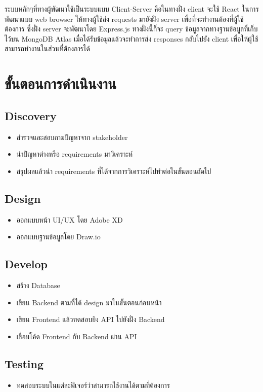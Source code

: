 ระบบหลักๆที่ทางผู้พัฒนาใช้เป็นระบบแบบ Client-Server คือในทางฝั่ง client จะใช้ React ในการพัฒนาแบบ web browser ให้ทางผู้ใช้ส่ง requests มายังฝั่ง server เพื่อที่จะทำงานต้องที่ผู้ใช้ต้องการ ซึ่งฝั่ง server 
จะพัฒนาโดย Express.js ทางฝั่งนี้ก็จะ query ข้อมูลจากทางฐานข้อมูลที่เก็บไว้บน MongoDB Atlas เมื่อได้รับข้อมูลแล้วจะทำการส่ง responses กลับไปยัง client เพื่อให้ผู้ใช้สามารถทำงานในส่วนที่ต้องการได้

\section{ขั้นตอนการดำเนินงาน}
\subsection{Discovery}
\begin{itemize}
  \item สำรวจและสอบถามปัญหาจาก stakeholder
  \item นำปัญหาต่างหรือ requirements มาวิเคราะห์
  \item สรุปผลแล้วนำ requirements ที่ได้จากการวิเคราะห์ไปทำต่อในขั้นตอนถัดไป
\end{itemize}

\subsection{Design}
\begin{itemize}
  \item ออกแบบหน้า UI/UX โดย Adobe XD
  \item ออกแบบฐานข้อมูลโดย Draw.io
\end{itemize}

\subsection{Develop}
\begin{itemize}
  \item สร้าง Database
  \item เขียน Backend ตามที่ได้ design มาในขั้นตอนก่อนหน้า
  \item เขียน Frontend แล้วทดสอบยิง API ไปยังฝั่ง Backend
  \item เชื่อมโค้ด Frontend กับ Backend ผ่าน API
\end{itemize}

\subsection{Testing}
\begin{itemize}
  \item ทดสอบระบบในแต่ละฟีเจอร์ว่าสามารถใช้งานได้ตามที่ต้องการ
\end{itemize}

